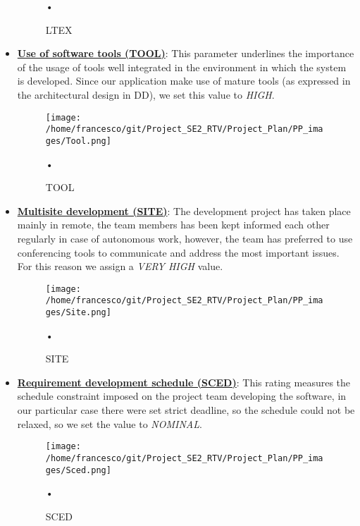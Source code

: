 \documentclass[10pt, a4paper,titlepage]{article}
\begin{document}
\begin{itemize}
\begin{figure}[h]
\begin{center}
\caption{LTEX}
\label{fig:LTEX}
\end{center}•
\end{figure}
\linebreak
\item \underline{\textbf{Use of software tools (TOOL)}}: This parameter underlines the importance of the usage of tools well integrated in the environment in which the system is developed. Since our application make use of mature tools (as expressed in the architectural design in DD), we set this value to \emph{HIGH}.
\begin{figure}[h]
\begin{center}
\texttt{[image: /home/francesco/git/Project\_SE2\_RTV/Project\_Plan/PP\_images/Tool.png]}
\caption{TOOL}
\label{fig:TOOL}
\end{center}•
\end{figure}
\pagebreak
\item \underline{\textbf{Multisite development (SITE)}}: The development project has taken place mainly in remote, the team members has been kept informed each other regularly in case of autonomous work, however, the team has preferred to use conferencing tools to communicate and address the most important issues. For this reason we assign a \emph{VERY HIGH} value.
\begin{figure}[h]
\begin{center}
\texttt{[image: /home/francesco/git/Project\_SE2\_RTV/Project\_Plan/PP\_images/Site.png]}
\caption{SITE}
\label{fig:SITE}
\end{center}•
\end{figure}
\linebreak
\item \underline{\textbf{Requirement development schedule (SCED)}}: This rating measures the schedule constraint imposed on the project team developing the software, in our particular case there were set strict deadline, so the schedule could not be relaxed, so we set the value to \emph{NOMINAL}.
\begin{figure}[h]
\begin{center}
\texttt{[image: /home/francesco/git/Project\_SE2\_RTV/Project\_Plan/PP\_images/Sced.png]}
\caption{SCED}
\label{fig:SCED}
\end{center}•
\end{figure}
\pagebreak
\end{itemize}
\end{document}
